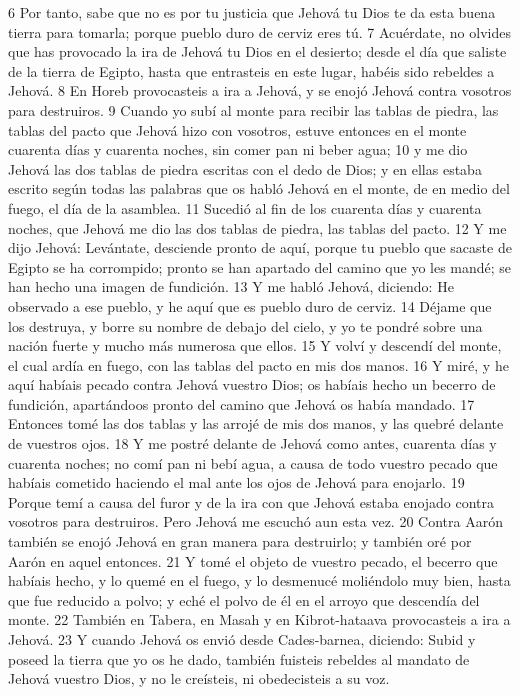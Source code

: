 6 Por tanto, sabe que no es por tu justicia que Jehová tu Dios te da esta buena tierra para tomarla; porque pueblo duro de cerviz eres tú. 
7 Acuérdate, no olvides que has provocado la ira de Jehová tu Dios en el desierto; desde el día que saliste de la tierra de Egipto, hasta que entrasteis en este lugar, habéis sido rebeldes a Jehová.
8 En Horeb provocasteis a ira a Jehová, y se enojó Jehová contra vosotros para destruiros.
9 Cuando yo subí al monte para recibir las tablas de piedra, las tablas del pacto que Jehová hizo con vosotros, estuve entonces en el monte cuarenta días y cuarenta noches, sin comer pan ni beber agua;
10 y me dio Jehová las dos tablas de piedra escritas con el dedo de Dios; y en ellas estaba escrito según todas las palabras que os habló Jehová en el monte, de en medio del fuego, el día de la asamblea.
11 Sucedió al fin de los cuarenta días y cuarenta noches, que Jehová me dio las dos tablas de piedra, las tablas del pacto.
12 Y me dijo Jehová: Levántate, desciende pronto de aquí, porque tu pueblo que sacaste de Egipto se ha corrompido; pronto se han apartado del camino que yo les mandé; se han hecho una imagen de fundición.
13 Y me habló Jehová, diciendo: He observado a ese pueblo, y he aquí que es pueblo duro de cerviz.
14 Déjame que los destruya, y borre su nombre de debajo del cielo, y yo te pondré sobre una nación fuerte y mucho más numerosa que ellos.
15 Y volví y descendí del monte, el cual ardía en fuego, con las tablas del pacto en mis dos manos.
16 Y miré, y he aquí habíais pecado contra Jehová vuestro Dios; os habíais hecho un becerro de fundición, apartándoos pronto del camino que Jehová os había mandado.
17 Entonces tomé las dos tablas y las arrojé de mis dos manos, y las quebré delante de vuestros ojos.
18 Y me postré delante de Jehová como antes, cuarenta días y cuarenta noches; no comí pan ni bebí agua, a causa de todo vuestro pecado que habíais cometido haciendo el mal ante los ojos de Jehová para enojarlo. 
19 Porque temí a causa del furor y de la ira con que Jehová estaba enojado contra vosotros para destruiros. Pero Jehová me escuchó aun esta vez.
20 Contra Aarón también se enojó Jehová en gran manera para destruirlo; y también oré por Aarón en aquel entonces.
21 Y tomé el objeto de vuestro pecado, el becerro que habíais hecho, y lo quemé en el fuego, y lo desmenucé moliéndolo muy bien, hasta que fue reducido a polvo; y eché el polvo de él en el arroyo que descendía del monte.
22 También en Tabera, en Masah y en Kibrot-hataava  provocasteis a ira a Jehová.
23 Y cuando Jehová os envió desde Cades-barnea, diciendo: Subid y poseed la tierra que yo os he dado, también fuisteis rebeldes al mandato de Jehová vuestro Dios, y no le creísteis, ni obedecisteis a su voz.
